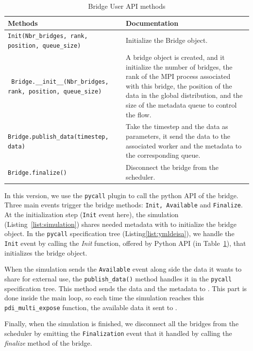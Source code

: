 \begin{table}[ht]
\begin{tabular}{||  m{6cm}  m{9cm} ||} 
 \hline
Methods & Documentation\\ 
 \hline\hline
 \texttt{Init(Nbr\_bridges, rank, position, queue\_size) } & Initialize the Bridge object.\\ 
 \hline \hline 
\texttt{ Bridge.\_\_init\_\_(Nbr\_bridges, rank, position, queue\_size)} & A bridge object is created, and it initialize the number of bridges, the rank of the MPI process associated with this bridge, the position of the data in the global distribution, and the size of the metadata queue to control the flow. \\ 
 \hline\hline
 \texttt{Bridge.publish\_data(timestep, data)} & Take the timestep and the data as parameters, it send the data to the associated worker and the metadata to the corresponding queue. \\
 \hline\hline
 \texttt{Bridge.finalize()} &   Disconnect the bridge from the scheduler. \\
 \hline
\end{tabular}
\caption{Bridge User API methods}
\label{table:bridge}
\end{table}

In this version, we use the \pdi \texttt{pycall} plugin to call the python API of the bridge. Three main events trigger the bridge methods: \texttt{Init, Available} and \texttt{Finalize}. 
At the initialization step (\texttt{Init} event here), the simulation (Listing~\ref{list:simulation}) shares needed metadata with \pdi to initialize the bridge object. In the \texttt{pycall} specification tree (Listing\ref{list:ymldeisa}), we handle the \texttt{Init} event by calling the \textit{Init} function, offered by Python \deisa API (in Table~\ref{table:bridge}), that initializes the bridge object.

When the simulation sends the \texttt{Available} event along side the data it wants to share for external use, the \texttt{publish\_data()} method handles it in the \texttt{pycall} specification tree. This method sends the data and the metadata to \dask. This part is done inside the main loop, so each time the simulation reaches this \texttt{pdi\_multi\_expose} function, the available data it sent to \dask.  

Finally, when the simulation is finished, we disconnect all the bridges from the \dask scheduler by emitting the \texttt{Finalization} event that it handled by calling the \textit{finalize} method of the bridge. 

